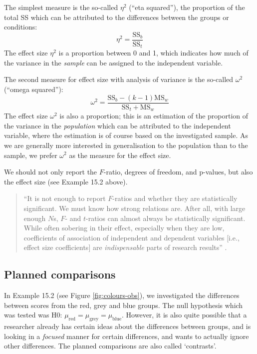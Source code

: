 \documentclass[
]{book}
\begin{document}
The simplest measure is the so-called \(\eta^2\) (``eta
squared''), the proportion of the total SS which can be attributed to the
differences between the groups or conditions: \[\label{eq:etasq}
    \eta^2 = \frac{ \textrm{SS}_b } { \textrm{SS}_t }\] The effect size
\(\eta^2\) is a proportion between 0 and 1, which indicates how much of the
variance in the \emph{sample} can be assigned to the independent
variable.

The second measure for effect size with analysis of variance is the so-called
\(\omega^2\) (``omega squared''):
\begin{equation}
  \label{eq:omegasq}
    \omega^2 = \frac{ \textrm{SS}_b - (k-1) \textrm{MS}_w} { \textrm{SS}_t + \textrm{MS}_w }
\end{equation}
The effect size \(\omega^2\) is also a proportion; this is an estimation
of the proportion of the variance in the \emph{population} which can be attributed
to the independent variable, where the estimation is of course based
on the investigated sample. As we are generally more interested in
generalisation to the population than to the sample, we prefer \(\omega^2\)
as the measure for the effect size.

We should not only report the \(F\)-ratio, degrees of freedom,
and p-values, but also the effect size (see
Example 15.2 above).

\begin{quote}
``It is not enough to report
\(F\)-ratios and whether they are statistically significant. We must know
how strong relations are. After all, with large enough \(N\)s, \(F\)- and
\(t\)-ratios can almost always be statistically significant. While often
sobering in their effect, especially when they are low, coefficients of
association of independent and dependent variables {[}i.e., effect size
coefficients{]} are \emph{indispensable} parts of research results'' \citep[ p.327, emphasis added]{KL00}.
\end{quote}

\hypertarget{sec:anova-oneway-planned}{%
\subsection{Planned comparisons}\label{sec:anova-oneway-planned}}

In Example 15.2 (see
Figure \ref{fig:colours-obs}), we investigated the differences between
scores from the red, grey and blue groups. The null hypothesis which was tested
was H0:
\(\mu_\textrm{red} = \mu_\textrm{grey} = \mu_\textrm{blue}\).
However, it is also quite possible that a researcher already has
certain ideas about the differences between groups, and is looking in a
\emph{focused} manner for certain differences, and wants to actually ignore other
differences. The planned comparisons are also called `contrasts'.
\end{document}
